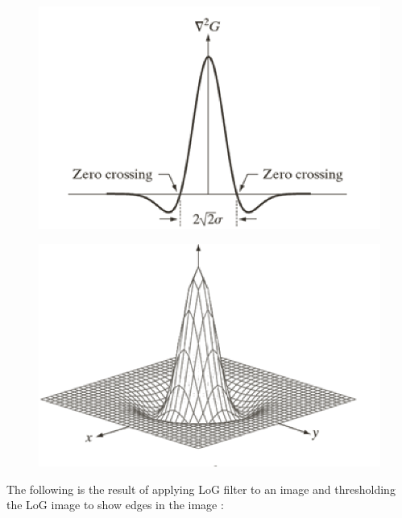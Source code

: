 \documentclass{article}
\begin{document}
		\begin{figure}[H]
			\begin{minipage}{.5\textwidth}
				\centering
				\includegraphics[width=0.6\linewidth]{images/log_1.png}
				\label{fig:test12}
			\end{minipage}
			\begin{minipage}{.5\textwidth}
				\centering
				\includegraphics[width=0.6\linewidth]{images/log_2.png}
				\label{fig:test13}
			\end{minipage}
		\end{figure}

		The following is the result of applying LoG filter to an image and thresholding the LoG image to show edges in the image : 
		
\end{document}
